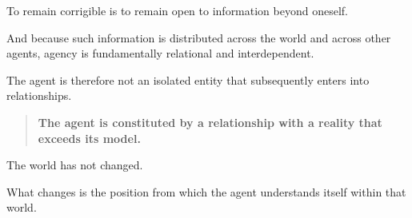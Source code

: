 \documentclass[11pt,a4paper]{article}
\begin{document}
To remain corrigible is to remain open to information beyond oneself.

And because such information is distributed across the world and across
other agents, agency is fundamentally relational and interdependent.

The agent is therefore not an isolated entity that subsequently enters into
relationships.

\begin{quote}
\textbf{
The agent is constituted by a relationship with a reality that exceeds
its model.
}
\end{quote}

The world has not changed.

What changes is the position from which the agent understands itself within
that world.
\end{document}

